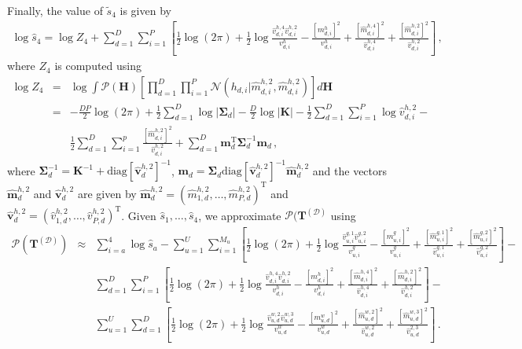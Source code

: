 Finally, the value of $\tilde{s}_{4}$ is given by
\begin{align}
\log\hat{s}_4 = \log Z_4 + \sum_{d=1}^{D}\sum_{i=1}^{P}\left[
\frac{1}{2}\log(2\pi)+\frac{1}{2}\log \frac{\hat{v}_{d,i}^{h,4} \hat{v}_{d,i}^{h,2}}{v_{d,i}^h}-
\frac{[m_{d,i}^h]^2}{v_{d,i}^h}+\frac{[\hat{m}_{d,i}^{h,4}]^2}{\hat{v}_{d,i}^{h,4}}+
\frac{[\hat{m}_{d,i}^{h,2}]^2}{\hat{v}_{d,i}^{h,2}}\right]\,,
\end{align}
where $Z_4$ is computed using
\begin{eqnarray}
\log Z_{4}  & = & \log \int \mathcal{P}(\mathbf{H})\left[\prod_{d=1}^{D}\prod_{i=1}^{P}
\mathcal{N}(h_{d,i}|\hat{m}_{d,i}^{h,2},\hat{m}_{d,i}^{h,2})\right]d\mathbf{H}\nonumber\\
& = & -\frac{DP}{2}\log(2\pi) + \frac{1}{2}\sum_{d=1}^D\log|\bm \Sigma_d| -
\frac{D}{2}\log|\mathbf{K}| - \frac{1}{2} \sum_{d=1}^D\sum_{i=1}^P \log \hat{v}_{d,i}^{h,2} - \nonumber \\
& & \frac{1}{2} \sum_{d=1}^D\sum_{i=1}^p \frac{[\hat{m}_{d,i}^{h,2}]^2}{\hat{v}_{d,i}^{h,2}} +
\sum_{d=1}^D \mathbf{m}_d^\text{T} \bm \Sigma_d^{-1} \mathbf{m}_d\,,\label{eq:Z4}
\end{eqnarray}
where $\bm \Sigma_d^{-1} = \mathbf{K}^{-1} + \text{diag}[\hat{\mathbf{v}}_d^{h,2}]^{-1}$,
$\mathbf{m}_d = \bm \Sigma_d \text{diag}[\hat{\mathbf{v}}_d^{h,2}]^{-1} \hat{\mathbf{m}}_d^{h,2}$
and the vectors $\hat{\mathbf{m}}_d^{h,2}$ and $\hat{\mathbf{v}}_d^{h,2}$ are given by
$\hat{\mathbf{m}}_d^{h,2}=(\hat{m}_{1,d}^{h,2},\ldots,\hat{m}_{P,d}^{h,2})^\text{T}$ and
$\hat{\mathbf{v}}_d^{h,2}=(\hat{v}_{1,d}^{h,2},\ldots,\hat{v}_{P,d}^{h,2})^\text{T}$.
Given $\hat{s}_1,\ldots,\hat{s}_4$, we approximate $\mathcal{P}(\mathbf{T}^{(\mathcal{D})}$ using
\begin{eqnarray}
\mathcal{P}(\mathbf{T}^{(\mathcal{D})}) & \approx & \sum_{i=a}^{4}\log\hat{s}_{a}-
\sum_{u=1}^{U}\sum_{i=1}^{M_u}\left[\frac{1}{2}\log(2\pi)+\frac{1}{2}\log \frac{\hat{v}_{u,i}^{g,1} \hat{v}_{u,i}^{g,2}}{v_{u,i}^g}-
\frac{[m_{u,i}^g]^2}{v_{u,i}^g}+\frac{[\hat{m}_{u,i}^{g,1}]^2}{\hat{v}_{u,i}^{g,1}}+
\frac{[\hat{m}_{u,i}^{g,2}]^2}{\hat{v}_{u,i}^{g,2}}\right]-\nonumber\\
& & \sum_{d=1}^{D}\sum_{i=1}^{P}\left[
\frac{1}{2}\log(2\pi)+\frac{1}{2}\log \frac{\hat{v}_{d,i}^{h,4} \hat{v}_{d,i}^{h,2}}{v_{d,i}^h}-
\frac{[m_{d,i}^h]^2}{v_{d,i}^h}+\frac{[\hat{m}_{d,i}^{h,4}]^2}{\hat{v}_{d,i}^{h,4}}+
\frac{[\hat{m}_{d,i}^{h,2}]^2}{\hat{v}_{d,i}^{h,2}}\right]-\nonumber\\
& & \sum_{u=1}^{U}\sum_{d=1}^{D}\left[\frac{1}{2}\log(2\pi)+
\frac{1}{2}\log \frac{\hat{v}_{u,d}^{w,2}\hat{v}_{u,d}^{w,3}}{v_{u,d}^w}-
\frac{[m_{u,d}^w]^2}{v_{u,d}^w}+\frac{[\hat{m}_{u,d}^{w,2}]^2}{\hat{v}_{u,d}^{w,2}}+
\frac{[\hat{m}_{u,d}^{w,3}]^2}{\hat{v}_{u,d}^{2,3}}\right]\,.
\end{eqnarray}
